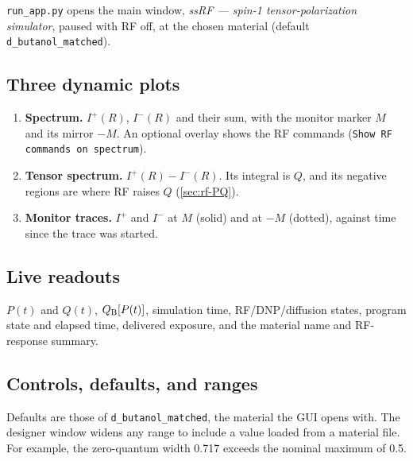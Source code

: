 \documentclass[11pt]{article}
\newcommand{\Iplus}{I^{+}}
\newcommand{\Iminus}{I^{-}}
\newcommand{\code}[1]{\texttt{#1}}
\begin{document}
\code{run\_app.py} opens the main window, \emph{ssRF --- spin-1 tensor-polarization simulator},
paused with RF off, at the chosen material (default \code{d\_butanol\_matched}).

\subsection{Three dynamic plots}

\begin{enumerate}
  \item \textbf{Spectrum.} \(\Iplus(R)\), \(\Iminus(R)\) and their sum, with the monitor marker
  \(M\) and its mirror \(-M\). An optional overlay shows the RF commands (\code{Show RF commands
  on spectrum}).
  \item \textbf{Tensor spectrum.} \(\Iplus(R)-\Iminus(R)\). Its integral is \(Q\), and its
  negative regions are where RF raises \(Q\) (\cref{sec:rf-PQ}).
  \item \textbf{Monitor traces.} \(\Iplus\) and \(\Iminus\) at \(M\) (solid) and at \(-M\)
  (dotted), against time since the trace was started.
\end{enumerate}

\subsection{Live readouts}

\(P(t)\) and \(Q(t)\), \(Q_{\rm B}[P(t)]\), simulation time, RF/DNP/diffusion states, program
state and elapsed time, delivered exposure, and the material name and RF-response summary.

\subsection{Controls, defaults, and ranges}

Defaults are those of \code{d\_butanol\_matched}, the material the GUI opens with. The
designer window widens any range to include a value loaded from a material file. For example,
the zero-quantum width 0.717 exceeds the nominal maximum of 0.5.
\end{document}
